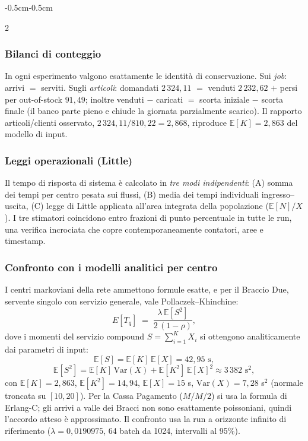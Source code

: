\documentclass{article}
\begin{document}
\begin{adjustwidth}{-0.5cm}{-0.5cm}
\begin{multicols}{2}
\subsubsection*{Bilanci di conteggio}
In ogni esperimento valgono esattamente le identità di conservazione. Sui \emph{job}: arrivi  $=$ serviti. Sugli
\emph{articoli}: domandati $2\,324{,}11$ $=$ venduti $2\,232{,}62$ $+$ persi per out-of-stock
$91{,}49$; inoltre venduti $-$ caricati $=$ scorta iniziale $-$ scorta finale (il banco parte
pieno e chiude la giornata parzialmente scarico). Il rapporto articoli/clienti osservato,
$2\,324{,}11/810{,}22 = 2{,}868$, riproduce $\mathbb{E}[K] = 2{,}863$ del modello di input.

\subsubsection*{Leggi operazionali (Little)}
Il tempo di risposta di sistema è calcolato in \emph{tre modi indipendenti}: (A) somma dei tempi
per centro pesata sui flussi, (B) media dei tempi individuali ingresso--uscita, (C) legge di
Little applicata all'area integrata della popolazione ($\mathbb{E}[N]/X$). I tre stimatori
coincidono entro frazioni di punto percentuale in tutte le run,  una verifica incrociata che
copre contemporaneamente contatori, aree e timestamp.

\subsubsection*{Confronto con i modelli analitici per centro}
I centri markoviani della rete ammettono formule esatte, e per il Braccio Due,  servente singolo
con servizio generale,  vale Pollaczek--Khinchine:
\[
E[T_q] \;=\; \frac{\lambda\,\mathbb{E}[S^2]}{2\,(1-\rho)},
\]
dove i momenti del servizio compound $S=\sum_{i=1}^{K}X_i$ si ottengono analiticamente dai
parametri di input:
\[
\mathbb{E}[S] = \mathbb{E}[K]\,\mathbb{E}[X] = 42{,}95 \text{ s},
\]
\[
\mathbb{E}[S^2] = \mathbb{E}[K]\,\mathrm{Var}(X) + \mathbb{E}[K^2]\,\mathbb{E}[X]^2 \approx 3\,382
\text{ s}^2,
\]
con $\mathbb{E}[K]=2{,}863$, $\mathbb{E}[K^2]=14{,}94$, $\mathbb{E}[X]=15$ s,
$\mathrm{Var}(X)=7{,}28$ s$^2$ (normale troncata su $[10,20]$). Per la Cassa Pagamento
($M/M/2$) si usa la formula di Erlang-C; gli arrivi a valle dei Bracci non sono esattamente
poissoniani, quindi l'accordo atteso è approssimato. Il confronto usa la run a orizzonte infinito
di riferimento ($\lambda = 0{,}0190975$, 64 batch da 1024, intervalli al 95\%).
\end{multicols}


\end{adjustwidth}
\end{document}
